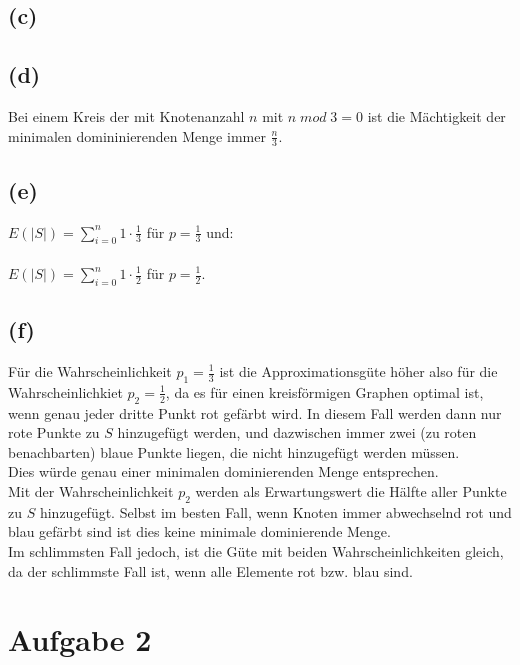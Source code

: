 \documentclass[a4paper]{scrartcl}
\begin{document}
\subsection*{(c)}


\subsection*{(d)}
Bei einem Kreis der mit Knotenanzahl $n$ mit $n\;mod\;3=0$ ist die Mächtigkeit der minimalen domininierenden Menge immer $\frac{n}{3}$.



\subsection*{(e)}
$E(|S|)  = \sum_{i=0}^{n} 1 \cdot \frac{1}{3}$ für $p = \frac{1}{3}$ und:\\
\\
$E(|S|)  = \sum_{i=0}^{n} 1 \cdot \frac{1}{2}$ für $p = \frac{1}{2}$.


\subsection*{(f)}
Für die Wahrscheinlichkeit $p_1 = \frac{1}{3}$ ist die Approximationsgüte höher also für die Wahrscheinlichkiet $p_2 = \frac{1}{2}$, da es für einen kreisförmigen Graphen optimal ist, wenn genau jeder dritte Punkt rot gefärbt wird. In diesem Fall werden dann nur rote Punkte zu $S$ hinzugefügt werden, und dazwischen immer zwei (zu roten benachbarten) blaue Punkte liegen, die nicht hinzugefügt werden müssen.\\
Dies würde genau einer minimalen dominierenden Menge entsprechen.\\
Mit der Wahrscheinlichkeit $p_2$ werden als Erwartungswert die Hälfte aller Punkte zu $S$ hinzugefügt. Selbst im besten Fall, wenn Knoten immer abwechselnd rot und blau gefärbt sind ist dies keine minimale dominierende Menge.\\
Im schlimmsten Fall jedoch, ist die Güte mit beiden Wahrscheinlichkeiten gleich, da der schlimmste Fall ist, wenn alle Elemente rot bzw. blau sind.









\section*{Aufgabe 2}
\end{document}
